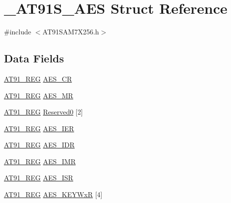 \hypertarget{struct__AT91S__AES}{\section{\-\_\-\-A\-T91\-S\-\_\-\-A\-E\-S Struct Reference}
\label{struct__AT91S__AES}
}


{\ttfamily \#include $<$A\-T91\-S\-A\-M7\-X256.\-h$>$}

\subsection*{Data Fields}
\begin{DoxyCompactItemize}
\item 
\hyperlink{GCC_2ARM7__AT91SAM7S_2AT91SAM7X256_8h_a712ad5a1ac1bd02f3e95a7526c283ce1}{A\-T91\-\_\-\-R\-E\-G} \hyperlink{struct__AT91S__AES_ab3ba921e79e8215004773e86e4da0d9b}{A\-E\-S\-\_\-\-C\-R}
\item 
\hyperlink{GCC_2ARM7__AT91SAM7S_2AT91SAM7X256_8h_a712ad5a1ac1bd02f3e95a7526c283ce1}{A\-T91\-\_\-\-R\-E\-G} \hyperlink{struct__AT91S__AES_a9aef7b71cde64f668f417acd5315db00}{A\-E\-S\-\_\-\-M\-R}
\item 
\hyperlink{GCC_2ARM7__AT91SAM7S_2AT91SAM7X256_8h_a712ad5a1ac1bd02f3e95a7526c283ce1}{A\-T91\-\_\-\-R\-E\-G} \hyperlink{struct__AT91S__AES_addafe86fd384f01d4ce0701147b9bf50}{Reserved0} \mbox{[}2\mbox{]}
\item 
\hyperlink{GCC_2ARM7__AT91SAM7S_2AT91SAM7X256_8h_a712ad5a1ac1bd02f3e95a7526c283ce1}{A\-T91\-\_\-\-R\-E\-G} \hyperlink{struct__AT91S__AES_aa34c05570476531c96390ff93049ad16}{A\-E\-S\-\_\-\-I\-E\-R}
\item 
\hyperlink{GCC_2ARM7__AT91SAM7S_2AT91SAM7X256_8h_a712ad5a1ac1bd02f3e95a7526c283ce1}{A\-T91\-\_\-\-R\-E\-G} \hyperlink{struct__AT91S__AES_a90641cdaa7cb555907f56ceaebba1140}{A\-E\-S\-\_\-\-I\-D\-R}
\item 
\hyperlink{GCC_2ARM7__AT91SAM7S_2AT91SAM7X256_8h_a712ad5a1ac1bd02f3e95a7526c283ce1}{A\-T91\-\_\-\-R\-E\-G} \hyperlink{struct__AT91S__AES_a0e6b99ee7321d011bc6f3c7347849270}{A\-E\-S\-\_\-\-I\-M\-R}
\item 
\hyperlink{GCC_2ARM7__AT91SAM7S_2AT91SAM7X256_8h_a712ad5a1ac1bd02f3e95a7526c283ce1}{A\-T91\-\_\-\-R\-E\-G} \hyperlink{struct__AT91S__AES_a072ce6f604d1f9d50f3fcaa145ec7d1e}{A\-E\-S\-\_\-\-I\-S\-R}
\item 
\hyperlink{GCC_2ARM7__AT91SAM7S_2AT91SAM7X256_8h_a712ad5a1ac1bd02f3e95a7526c283ce1}{A\-T91\-\_\-\-R\-E\-G} \hyperlink{struct__AT91S__AES_abcf863fdaabe92b8dbc666a84ad4e00f}{A\-E\-S\-\_\-\-K\-E\-Y\-Wx\-R} \mbox{[}4\mbox{]}

\end{DoxyCompactItemize}

